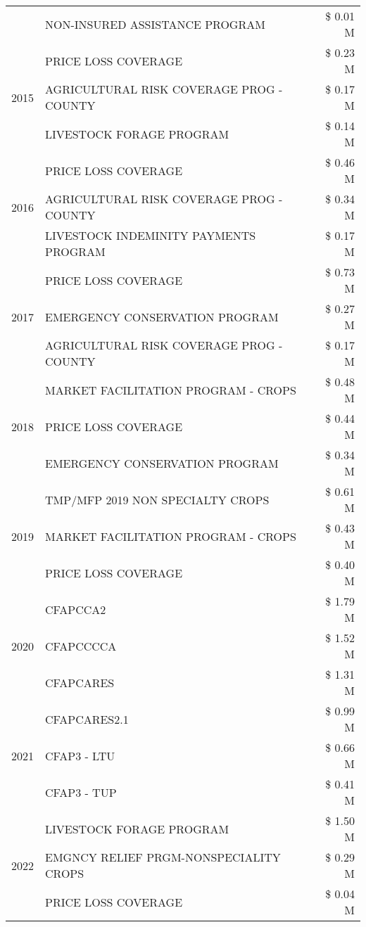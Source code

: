 \begin{tabular}{llr}
 & NON-INSURED ASSISTANCE PROGRAM & \$ 0.01 M \\
\cline{1-3}
\multirow[t]{3}{*}{2015} & PRICE LOSS COVERAGE & \$ 0.23 M \\
 & AGRICULTURAL RISK COVERAGE PROG - COUNTY & \$ 0.17 M \\
 & LIVESTOCK FORAGE PROGRAM & \$ 0.14 M \\
\cline{1-3}
\multirow[t]{3}{*}{2016} & PRICE LOSS COVERAGE & \$ 0.46 M \\
 & AGRICULTURAL RISK COVERAGE PROG - COUNTY & \$ 0.34 M \\
 & LIVESTOCK INDEMINITY PAYMENTS PROGRAM & \$ 0.17 M \\
\cline{1-3}
\multirow[t]{3}{*}{2017} & PRICE LOSS COVERAGE & \$ 0.73 M \\
 & EMERGENCY CONSERVATION PROGRAM & \$ 0.27 M \\
 & AGRICULTURAL RISK COVERAGE PROG - COUNTY & \$ 0.17 M \\
\cline{1-3}
\multirow[t]{3}{*}{2018} & MARKET FACILITATION PROGRAM - CROPS & \$ 0.48 M \\
 & PRICE LOSS COVERAGE & \$ 0.44 M \\
 & EMERGENCY CONSERVATION PROGRAM & \$ 0.34 M \\
\cline{1-3}
\multirow[t]{3}{*}{2019} & TMP/MFP 2019 NON SPECIALTY CROPS & \$ 0.61 M \\
 & MARKET FACILITATION PROGRAM - CROPS & \$ 0.43 M \\
 & PRICE LOSS COVERAGE & \$ 0.40 M \\
\cline{1-3}
\multirow[t]{3}{*}{2020} & CFAPCCA2 & \$ 1.79 M \\
 & CFAPCCCCA & \$ 1.52 M \\
 & CFAPCARES & \$ 1.31 M \\
\cline{1-3}
\multirow[t]{3}{*}{2021} & CFAPCARES2.1 & \$ 0.99 M \\
 & CFAP3 - LTU & \$ 0.66 M \\
 & CFAP3 - TUP & \$ 0.41 M \\
\cline{1-3}
\multirow[t]{3}{*}{2022} & LIVESTOCK FORAGE PROGRAM & \$ 1.50 M \\
 & EMGNCY RELIEF PRGM-NONSPECIALITY CROPS & \$ 0.29 M \\
 & PRICE LOSS COVERAGE & \$ 0.04 M \\
\cline{1-3}
\bottomrule
\end{tabular}
